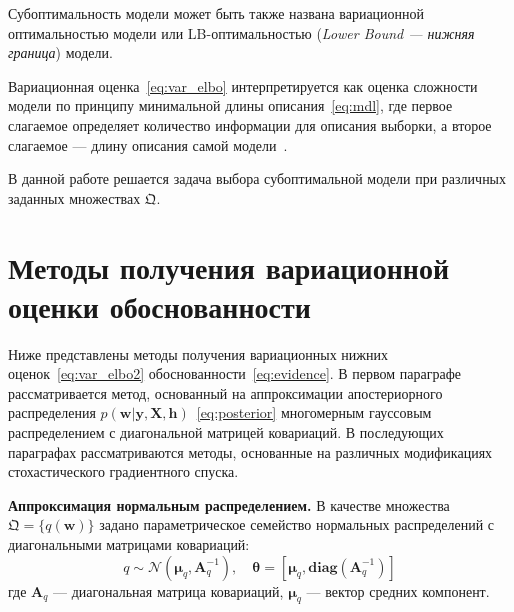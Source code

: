 {
Субоптимальность модели может быть также названа вариационной оптимальностью модели или LB-оптимальностью (\textit{Lower Bound --- нижняя граница}) модели.}

Вариационная оценка~\eqref{eq:var_elbo} интерпретируется как оценка сложности модели по принципу минимальной длины описания~\eqref{eq:mdl}, где первое слагаемое определяет количество информации для описания выборки, а второе слагаемое --- длину описания самой модели~\cite{nips}.

В данной работе решается задача выбора субоптимальной модели при различных заданных множествах $\mathfrak{Q}$.

\section{Методы получения вариационной оценки обоснованности}
Ниже представлены методы получения вариационных нижних оценок~\eqref{eq:var_elbo2} обоснованности~\eqref{eq:evidence}. В первом параграфе рассматривается метод, основанный на аппроксимации апостериорного распределения $p( \mathbf{w}|\mathbf{y}, \mathbf{X}, \mathbf{h})$~\eqref{eq:posterior} многомерным гауссовым распределением с диагональной матрицей ковариаций. В последующих параграфах рассматриваются методы, основанные на различных модификациях стохастического градиентного спуска. 

\textbf{Аппроксимация нормальным распределением. }
В качестве множества $\mathfrak{Q} = \{q(\mathbf{w})\}$ задано параметрическое семейство нормальных распределений с диагональными матрицами ковариаций:
\begin{equation}
\label{eq:diag}
	q \sim \mathcal{N}(\boldsymbol{\mu}_q, \mathbf{A}^{-1}_q),\quad\boldsymbol{\theta}=[\boldsymbol{\mu}_q, \textbf{diag}(\mathbf{A}^{-1}_q)]
\end{equation}
где $\mathbf{A}_q$ --- диагональная матрица ковариаций, $\boldsymbol{\mu}_q$ --- вектор средних компонент.

